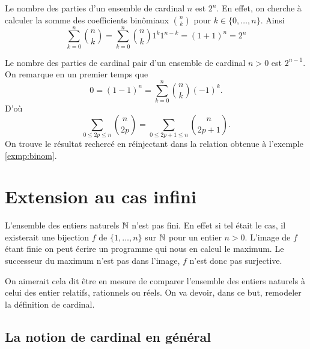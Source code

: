 \documentclass[12pt, a4paper]{article}
\begin{document}
\begin{exmp}
  \label{exmp:binom}
  Le nombre des parties d'un ensemble de cardinal $n$ est $2^n$. En
  effet, on cherche à calculer la somme des coefficients binômiaux
  $\binom{n}{k}$ pour $k \in \{0, \ldots, n\}$. Ainsi
  \[
    \sum_{k=0}^n \binom{n}{k} = \sum_{k=0}^n \binom{n}{k}1^k1^{n-k} =
    (1+1)^n = 2^n
  \]
\end{exmp}
\begin{exmp}
  Le nombre des parties de cardinal pair d'un ensemble de cardinal
  $n > 0$ est $2^{n-1}$. On remarque en un premier temps que
  \[
    0 = (1 - 1)^n = \sum_{k=0}^n \binom{n}{k}(-1)^k.
  \]
  D'où
  \[
    \sum_{0 \leq 2p \leq n} \binom{n}{2p} =  \sum_{0 \leq 2p+1 \leq n} \binom{n}{2p+1}.
  \]
  On trouve le résultat rechercé en réinjectant dans la relation
  obtenue à l'exemple \ref{exmp:binom}.
\end{exmp}

\section{Extension au cas infini}

L'ensemble des entiers naturels $\mathbb{N}$ n'est pas fini. En effet si tel
était le cas, il existerait une bijection $f$ de $\{1, \ldots, n\}$
sur $\mathbb{N}$ pour un entier $n > 0$. L'image de $f$ étant finie on peut
écrire un programme qui nous en calcul le maximum. Le successeur du
maximum n'est pas dans l'image, $f$ n'est donc pas surjective.

On aimerait cela dit être en mesure de comparer l'ensemble des entiers
naturels à celui des entier relatifs, rationnels ou réels. On va
devoir, dans ce but, remodeler la définition de cardinal.

\subsection{La notion de cardinal en général}
\end{document}
